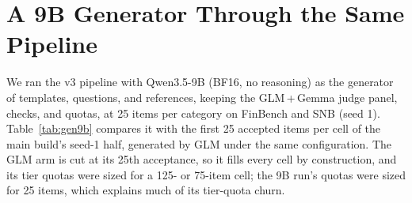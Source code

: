 \section{A 9B Generator Through the Same Pipeline}
\label{app:gen9b}
We ran the v3 pipeline with Qwen3.5-9B (BF16, no reasoning) as the generator of templates, questions, and references, keeping the GLM\,+\,Gemma judge panel, checks, and quotas, at 25 items per category on FinBench and SNB (seed 1). Table~\ref{tab:gen9b} compares it with the first 25 accepted items per cell of the main build's seed-1 half, generated by GLM under the same configuration. The GLM arm is cut at its 25th acceptance, so it fills every cell by construction, and its tier quotas were sized for a 125- or 75-item cell; the 9B run's quotas were sized for 25 items, which explains much of its tier-quota churn.

\begin{table}[H]
\centering
\footnotesize
\setlength{\tabcolsep}{4pt}
\caption{Qwen3.5-9B vs.\ GLM as the generator. About half of the 9B model's rejected template proposals declare slots their Cypher never uses, and its questions often break the category contract (e.g., a yes/no question whose query returns rows), so the pipeline rejects most of its candidates before the judges; what it does accept passes the same checks and panel. Given GLM's questions in the fixed-plan replay, its references return the released answer on 86\% of items, against 94\% for a second GLM run (Table~\ref{tab:validity}b).}
\label{tab:gen9b}
\end{table}

